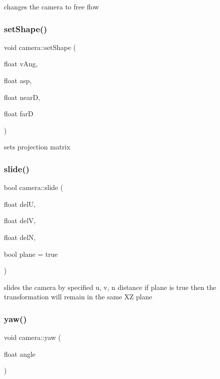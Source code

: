 changes the camera to free flow \hypertarget{classcamera_a3b99e5ad64e63db86d3e826e43fc2228}{}\label{classcamera_a3b99e5ad64e63db86d3e826e43fc2228} 
\subsubsection{\texorpdfstring{set\+Shape()}{setShape()}}
{\footnotesize\ttfamily void camera\+::set\+Shape (\begin{DoxyParamCaption}\item[{float}]{v\+Ang,  }\item[{float}]{asp,  }\item[{float}]{nearD,  }\item[{float}]{farD }\end{DoxyParamCaption})}

sets projection matrix \hypertarget{classcamera_a903ee814bc121ea7bf030b1f67b4281e}{}\label{classcamera_a903ee814bc121ea7bf030b1f67b4281e} 
\subsubsection{\texorpdfstring{slide()}{slide()}}
{\footnotesize\ttfamily bool camera\+::slide (\begin{DoxyParamCaption}\item[{float}]{delU,  }\item[{float}]{delV,  }\item[{float}]{delN,  }\item[{bool}]{plane = {\ttfamily true} }\end{DoxyParamCaption})}

slides the camera by specified u, v, n distance if plane is true then the transformation will remain in the same XZ plane \hypertarget{classcamera_acea846eceb98867afb1fc658ebe3bc50}{}\label{classcamera_acea846eceb98867afb1fc658ebe3bc50} 
\subsubsection{\texorpdfstring{yaw()}{yaw()}}
{\footnotesize\ttfamily void camera\+::yaw (\begin{DoxyParamCaption}\item[{float}]{angle }\end{DoxyParamCaption})}

